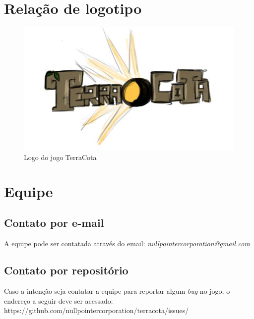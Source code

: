 \documentclass[11pt]{article}
\begin{document}
\section{Relação de logotipo}

\begin{figure}[!htp]
\centering
\includegraphics[scale=0.75]{logo-terracota.jpg}
\caption{Logo do jogo TerraCota}
\label{TerraCota logo}
\end{figure}

\section{Equipe}
\subsection{Contato por e-mail}
A equipe pode ser contatada através do email: \textit{nullpointercorporation@gmail.com}

\subsection{Contato por repositório}
Caso a intenção seja contatar a equipe para reportar algum \textit{bug} no jogo, o endereço a seguir deve ser acessado: https://github.com/nullpointercorporation/terracota/issues/
\newpage
\end{document}
